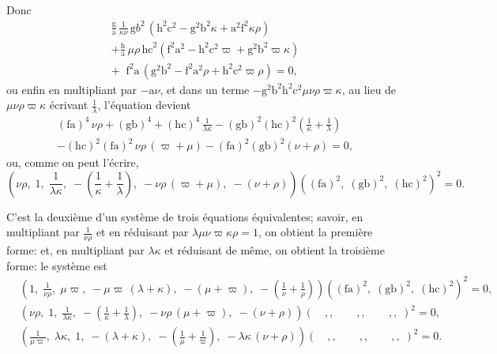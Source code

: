 \documentclass[12pt,a4paper,oneside]{book}
\theoremstyle{plain}
\theoremstyle{definition}
\theoremstyle{remark}
\begin{document}
Donc
\begin{multline*}
\frac{\mathrm{g}}{\mathrm{a}}\,\frac{1}{\kappa\nu}\,
  \mathrm{g}b^2\,(\mathrm{h}^2\mathrm{c}^2-\mathrm{g}^2\mathrm{b}^2\kappa+\mathrm{a}^2\mathrm{f}^2\kappa\rho)\\
+\frac{\mathrm{h}}{\mathrm{a}}\,\mu\rho\,
  \mathrm{hc}^2(\mathrm{f}^2\mathrm{a}^2-\mathrm{h}^2\mathrm{c}^2\varpi+\mathrm{g}^2\mathrm{b}^2\varpi\kappa)\\
+\phantom{..}\mathrm{f}^2\mathrm{a}\,(\mathrm{g}^2\mathrm{b}^2-\mathrm{f}^2\mathrm{a}^2\rho+\mathrm{h}^2\mathrm{c}^2\varpi\rho)=0,
\end{multline*}
ou enfin en multipliant par $-\mathrm{a}\nu$, et dans un terme $-\mathrm{g}^2\mathrm{b}^2\mathrm{h}^2\mathrm{c}^2\mu\nu\rho\varpi\kappa$, au lieu de $\mu\nu\rho\varpi\kappa$ \'ecrivant $\frac{1}{\lambda}$, l'\'equation devient
\begin{multline*}
(\mathrm{fa})^4\,\nu\rho+(\mathrm{gb})^4+(\mathrm{hc})^4\,\frac{1}{\lambda\kappa}
-(\mathrm{gb})^2(\mathrm{hc})^2\left(\frac{1}{\kappa}+\frac{1}{\lambda}\right)\\
-(\mathrm{hc})^2(\mathrm{fa})^2\,\nu\rho\,(\varpi+\mu)
-(\mathrm{fa})^2(\mathrm{gb})^2(\nu+\rho)=0,
\end{multline*}
ou, comme on peut l'\'ecrire,
\[
\left(\nu\rho,\; 1,\; \frac{1}{\lambda\kappa},\; -\left(\frac{1}{\kappa}+\frac{1}{\lambda}\right),\;
-\nu\rho\,(\varpi+\mu),\; -(\nu+\rho)\right)
((\mathrm{fa})^2,\; (\mathrm{gb})^2,\; (\mathrm{hc})^2)^2=0.
\]

C'est la deuxi\`eme d'un syst\`eme de trois \'equations \'equivalentes; savoir, en multipliant par $\frac{1}{\nu\rho}$ et en r\'eduisant par $\lambda\mu\nu\varpi\kappa\rho=1$, on obtient la premi\`ere forme: et, en multipliant par $\lambda\kappa$ et r\'eduisant de m\^eme, on obtient la troisi\`eme forme: le syst\`eme est
\begin{align*}
&\left(1,\; \frac{1}{\nu\rho},\; \mu\varpi,\; -\mu\varpi\,(\lambda+\kappa),\;
-(\mu+\varpi),\; -\left(\frac{1}{\nu}+\frac{1}{\rho}\right)\right)
((\mathrm{fa})^2,\; (\mathrm{gb})^2,\; (\mathrm{hc})^2)^2=0,\\
&\left(\nu\rho,\; 1,\; \frac{1}{\lambda\kappa},\; -\left(\frac{1}{\kappa}+\frac{1}{\lambda}\right),\;
-\nu\rho\,(\mu+\varpi),\; -(\nu+\rho)\right)(\quad,,\qquad,,\qquad,,\;)^2=0,\\
&\left(\frac{1}{\mu\varpi},\; \lambda\kappa,\; 1,\; -(\lambda+\kappa),\;
-\left(\frac{1}{\mu}+\frac{1}{\varpi}\right),\; -\lambda\kappa\,(\nu+\rho)\right)(\quad,,\qquad,,\qquad,,\;)^2=0.
\end{align*}
\end{document}
